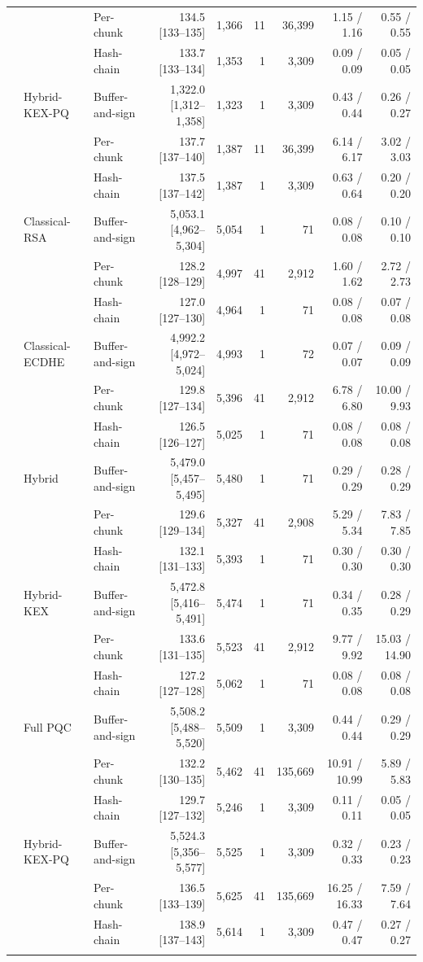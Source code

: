 \begin{table}[t]
\begin{tabular}{@{}rllrrrrrr@{}}
 &  & Per-chunk & 134.5 [133--135] & 1,366 & 11 & 36,399 & 1.15 / 1.16 & 0.55 / 0.55 \\
 &  & Hash-chain & 133.7 [133--134] & 1,353 & 1 & 3,309 & 0.09 / 0.09 & 0.05 / 0.05 \\
\addlinespace[1pt]
 & Hybrid-KEX-PQ & Buffer-and-sign & 1,322.0 [1,312--1,358] & 1,323 & 1 & 3,309 & 0.43 / 0.44 & 0.26 / 0.27 \\
 &  & Per-chunk & 137.7 [137--140] & 1,387 & 11 & 36,399 & 6.14 / 6.17 & 3.02 / 3.03 \\
 &  & Hash-chain & 137.5 [137--142] & 1,387 & 1 & 3,309 & 0.63 / 0.64 & 0.20 / 0.20 \\
\addlinespace[1pt]
\midrule
200 & Classical-RSA & Buffer-and-sign & 5,053.1 [4,962--5,304] & 5,054 & 1 & 71 & 0.08 / 0.08 & 0.10 / 0.10 \\
 &  & Per-chunk & 128.2 [128--129] & 4,997 & 41 & 2,912 & 1.60 / 1.62 & 2.72 / 2.73 \\
 &  & Hash-chain & 127.0 [127--130] & 4,964 & 1 & 71 & 0.08 / 0.08 & 0.07 / 0.08 \\
\addlinespace[1pt]
 & Classical-ECDHE & Buffer-and-sign & 4,992.2 [4,972--5,024] & 4,993 & 1 & 72 & 0.07 / 0.07 & 0.09 / 0.09 \\
 &  & Per-chunk & 129.8 [127--134] & 5,396 & 41 & 2,912 & 6.78 / 6.80 & 10.00 / 9.93 \\
 &  & Hash-chain & 126.5 [126--127] & 5,025 & 1 & 71 & 0.08 / 0.08 & 0.08 / 0.08 \\
\addlinespace[1pt]
 & Hybrid & Buffer-and-sign & 5,479.0 [5,457--5,495] & 5,480 & 1 & 71 & 0.29 / 0.29 & 0.28 / 0.29 \\
 &  & Per-chunk & 129.6 [129--134] & 5,327 & 41 & 2,908 & 5.29 / 5.34 & 7.83 / 7.85 \\
 &  & Hash-chain & 132.1 [131--133] & 5,393 & 1 & 71 & 0.30 / 0.30 & 0.30 / 0.30 \\
\addlinespace[1pt]
 & Hybrid-KEX & Buffer-and-sign & 5,472.8 [5,416--5,491] & 5,474 & 1 & 71 & 0.34 / 0.35 & 0.28 / 0.29 \\
 &  & Per-chunk & 133.6 [131--135] & 5,523 & 41 & 2,912 & 9.77 / 9.92 & 15.03 / 14.90 \\
 &  & Hash-chain & 127.2 [127--128] & 5,062 & 1 & 71 & 0.08 / 0.08 & 0.08 / 0.08 \\
\addlinespace[1pt]
 & Full PQC & Buffer-and-sign & 5,508.2 [5,488--5,520] & 5,509 & 1 & 3,309 & 0.44 / 0.44 & 0.29 / 0.29 \\
 &  & Per-chunk & 132.2 [130--135] & 5,462 & 41 & 135,669 & 10.91 / 10.99 & 5.89 / 5.83 \\
 &  & Hash-chain & 129.7 [127--132] & 5,246 & 1 & 3,309 & 0.11 / 0.11 & 0.05 / 0.05 \\
\addlinespace[1pt]
 & Hybrid-KEX-PQ & Buffer-and-sign & 5,524.3 [5,356--5,577] & 5,525 & 1 & 3,309 & 0.32 / 0.33 & 0.23 / 0.23 \\
 &  & Per-chunk & 136.5 [133--139] & 5,625 & 41 & 135,669 & 16.25 / 16.33 & 7.59 / 7.64 \\
 &  & Hash-chain & 138.9 [137--143] & 5,614 & 1 & 3,309 & 0.47 / 0.47 & 0.27 / 0.27 \\
\addlinespace[1pt]
\bottomrule
\end{tabular}
\end{table}
